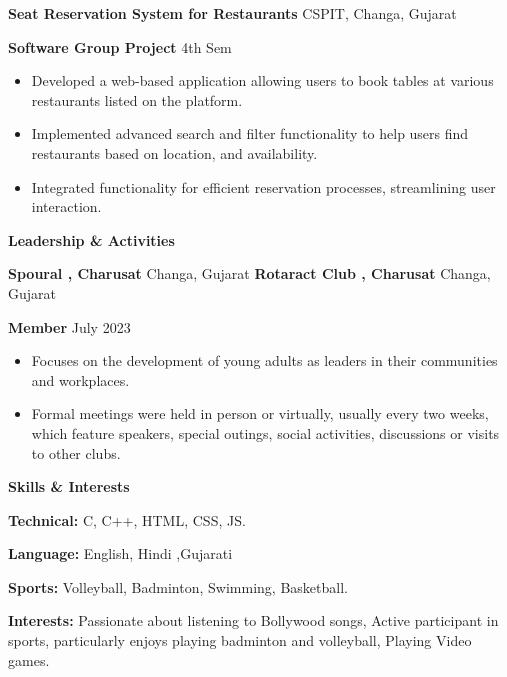 \documentclass[11pt]{article}
\begin{document}
\textbf{Seat Reservation System for Restaurants}	\hfill CSPIT, Changa, Gujarat

\textbf{Software Group Project} \hfill 4th Sem
\begin{itemize}[noitemsep, topsep=0pt, partopsep=0pt, parsep=0pt]
    \item Developed a web-based application allowing users to book tables at various restaurants listed on the platform.
    \item Implemented advanced search and filter functionality to help users find restaurants based on location, and availability.
    \item Integrated functionality for efficient reservation processes, streamlining user interaction.

\end{itemize}

\vspace{12pt}


\begin{center}
    \textbf{Leadership \& Activities}
\end{center}

\textbf{Spoural , Charusat}	\hfill Changa, Gujarat
\newline
\textbf{Rotaract Club , Charusat}	\hfill Changa, Gujarat

\textbf{Member} \hfill July 2023
\begin{itemize}[noitemsep, topsep=0pt, partopsep=0pt, parsep=0pt]
   \item Focuses on the development of young adults as leaders in their communities and workplaces.
   \item Formal meetings were held in person or virtually, usually every two weeks, which feature speakers, special outings, social activities, discussions or visits to other clubs.

\end{itemize}




\vspace{12pt}

\begin{center}
    \textbf{Skills \& Interests }
\end{center}

\textbf{Technical:} C, C++, HTML, CSS, JS.

\textbf{Language:} English, Hindi ,Gujarati 

\textbf{Sports:} Volleyball, Badminton, Swimming, Basketball.

\textbf{Interests:} Passionate about listening to Bollywood songs, Active participant in sports, particularly enjoys playing badminton and volleyball, Playing Video games.
\end{document}
